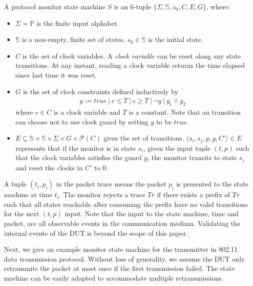 \begin{definition}
  A protocol monitor state machine $S$ is an 6-tuple $\{\Sigma, \mathbb{S}, s_0, C, E, G\}$, where:
  \begin{itemize}
    \item $\Sigma = \mathbb{P}$ is the finite input alphabet.
    \item $\mathbb{S}$ is a non-empty, finite set of states. $s_0 \in
      \mathbb{S}$ is the initial state.
    \item $C$ is the set of clock variables. A \textit{clock variable} can be
      reset along any state transitions. At any instant, reading a clock
      variable returns the time elapsed since last time it was reset.
    \item $G$ is the set of clock constraints defined inductively by
      \begin{align*}
        g := true\ |\ c \le T\ |\ c \ge T\ |\ \neg g\ |\ g_1 \land g_2
      \end{align*}%
      where $c \in C$ is a clock variable and $T$ is a constant. Note that an
      transition can choose not to use clock guard by setting $g$ to be $true$.
    \item $E \subseteq \mathbb{S} \times \mathbb{S} \times \Sigma \times  G \times \mathscr{P}(C)$
      gives the set of transitions. $\langle s_i, s_j, p, g, C'\rangle \in E$
      represents that if the monitor is in state $s_i$, given the input tuple
      $(t, p)$ such that the clock variables satisfies the guard $g$, the
      monitor transits to state $s_j$ and reset the clocks in $C'$ to 0.
  \end{itemize}
  \label{def:sm}
\end{definition}

A tuple $(t_i, p_i)$ in the packet trace means the packet $p_i$ is presented to
the state machine at time $t_i$.
%
The monitor rejects a trace $Tr$ if there exists a prefix of $Tr$ such that all
states reachable after consuming the prefix have no valid transitions for the
next $(t, p)$ input.
%
Note that the input to the state machine, time and packet, are all
observable events in the communication medium.
%
Validating the internal events of the DUT is beyond the
scope of this paper.

Next, we give an example monitor state machine for the transmitter in 802.11
data transmission protocol.
%
Without loss of generality, we assume the DUT only
retransmits the packet at most once if the first transmission failed.
%
The state machine can be easily adapted to accommodate multiple retransmissions.

